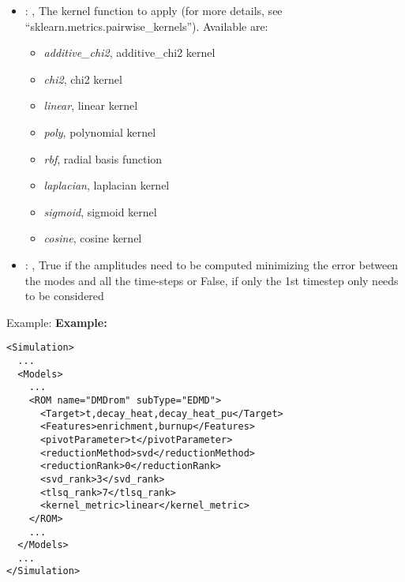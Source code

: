 \begin{itemize}
    \item {}: , 
      The kernel function to apply (for more details, see ``sklearn.metrics.pairwise\_kernels'').
      Available are:                                                   \begin{itemize}
      \item \textit{additive\_chi2}, additive\_chi2 kernel
      \item \textit{chi2}, chi2 kernel                                                     \item
      \textit{linear}, linear kernel                                                     \item
      \textit{poly}, polynomial kernel                                                     \item
      \textit{rbf}, radial basis function                                                     \item
      \textit{laplacian}, laplacian kernel                                                     \item
      \textit{sigmoid}, sigmoid kernel                                                     \item
      \textit{cosine}, cosine kernel                                                   \end{itemize}

    \item {}: , 
      True if the amplitudes need to be computed minimizing the error
      between the modes and all the time-steps or False, if only the 1st timestep only needs to be
      considered
  \end{itemize}

\hspace{24pt}
Example:
\textbf{Example:}
\begin{lstlisting}[style=XML,morekeywords={name,subType}]
<Simulation>
  ...
  <Models>
    ...
    <ROM name="DMDrom" subType="EDMD">
      <Target>t,decay_heat,decay_heat_pu</Target>
      <Features>enrichment,burnup</Features>
      <pivotParameter>t</pivotParameter>
      <reductionMethod>svd</reductionMethod>
      <reductionRank>0</reductionRank>
      <svd_rank>3</svd_rank>
      <tlsq_rank>7</tlsq_rank>
      <kernel_metric>linear</kernel_metric>
    </ROM>
    ...
  </Models>
  ...
</Simulation>
\end{lstlisting}

